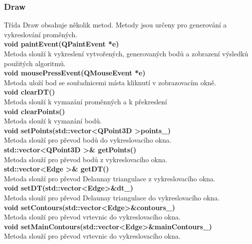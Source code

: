 \documentclass[a4paper, 12pt]{article}
\begin{document}
\subsubsection{Draw}
Třída Draw obsahuje několik metod. Metody jsou určeny pro generování a vykreslování proměných.
\\

\textbf{void paintEvent(QPaintEvent *e)}\\
Metoda slouží k vykreslení vytvořených, generovaných bodů a zobrazení výsledků použitých algoritmů.
\\

\textbf{void mousePressEvent(QMouseEvent *e)}\\
Metoda uloží bod se souřadnicemi místa kliknutí v zobrazovacím okně.
\\

\textbf{void clearDT()}\\
Metoda slouží k vymazání proměnných a k překreslení
\\

\textbf{void clearPoints()}\\
Metoda slouží k vymazání bodů.
\\

\textbf{void setPoints(std::vector\textless QPoint3D \textgreater points\_)}\\
Metoda slouží pro převod bodů do vykreslovacího okna.\\

\textbf{std::vector\textless QPoint3D \textgreater \& getPoints()}\\
Metoda slouží pro převod bodů z vykreslovacího okna.\\

\textbf{std::vector\textless Edge \textgreater \& getDT()}\\
Metoda slouží pro převod Delaunay triangulace z vykreslovacího okna.\\

\textbf{void setDT(std::vector\textless Edge\textgreater \&dt\_)}\\
Metoda slouží pro převod Delaunay triangulace do vykreslovacího okna.\\

\textbf{void setContours(std::vector\textless Edge\textgreater\&contours\_)}\\
Metoda slouží pro převod vrtevnic do vykreslovacího okna.\\

\textbf{void setMainContours(std::vector\textless Edge\textgreater\&mainContours\_)}\\
Metoda slouží pro převod vrtevnic do vykreslovacího okna.\\
\end{document}
